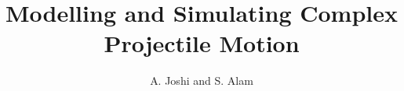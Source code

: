 \documentclass[a4paper,11pt]{article}
\title{\textbf{Modelling and Simulating Complex Projectile Motion}}
\author{A. Joshi and S. Alam}
\date{}
\begin{document}
\maketitle


\begin{multicols}{2}


\twocolumn

%



\newpage

\printbibliography


\end{multicols}
\end{document}
